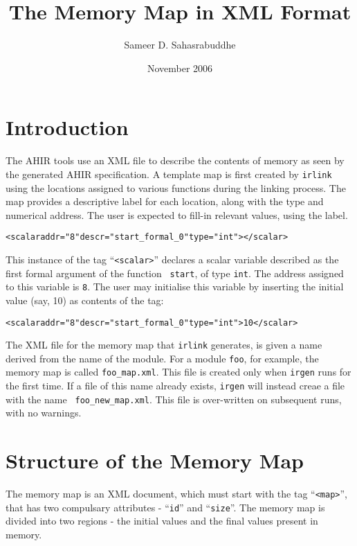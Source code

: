 \documentclass[12pt]{article}
\title{The Memory Map in XML Format}
\author{Sameer D. Sahasrabuddhe}
\date{November 2006}
\newcommand{\irgen}{{\tt irgen}}
\newcommand{\irlink}{{\tt irlink}}
\begin{document}
  \maketitle
  
  \section{Introduction}

  The AHIR tools use an XML file to describe the contents of memory as
  seen by the generated AHIR specification. A template map is first
  created by \irlink{} using the locations assigned to various functions
  during the linking process. The map provides a descriptive label for
  each location, along with the type and numerical address. The user
  is expected to fill-in relevant values, using the label.

  \begin{alltt}
  <scalar addr="8" descr="start_formal_0" type="int"></scalar>\end{alltt}

  This instance of the tag ``{\tt <scalar>}'' declares a scalar
  variable described as the first formal argument of the function {\tt
  start}, of type {\tt int}. The address assigned to this variable is
  {\tt 8}. The user may initialise this variable by inserting the
  initial value (say, 10) as contents of the tag:

  \begin{alltt}
  <scalar addr="8" descr="start_formal_0" type="int">10</scalar>\end{alltt}
  

   The XML file for the memory map that
  \irlink{} generates, is given a name derived from the name of the
  module. For a module {\tt foo}, for example, the memory map is
  called {\tt foo\_map.xml}. This file is created only when \irgen{}
  runs for the first time. If a file of this name already exists,
  \irgen{} will instead creae a file with the name {\tt
  foo\_new\_map.xml}. This file is over-written on subsequent runs,
  with no warnings.

  \section{Structure of the Memory Map}

  The memory map is an XML document, which must start with the tag
  ``{\tt <map>}'', that has two compulsary attributes - ``{\tt id}''
  and ``{\tt size}''. The memory map is divided into two regions - the
  initial values and the final values present in memory.
\end{document}
